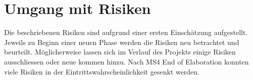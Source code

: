 \section{Umgang mit Risiken}
Die beschriebenen Risiken sind aufgrund einer ersten Einschätzung aufgestellt.
Jeweils zu Beginn einer neuen Phase werden die Risiken neu betrachtet und beurteilt. Möglicherweise lassen sich im Verlauf des Projekts einige Risiken ausschliessen oder neue kommen hinzu.
Nach MS4 End of Elaboration konnten viele Risiken in der Eintrittswahrscheinlichkeit gesenkt werden. 
